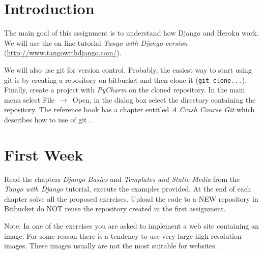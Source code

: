 \documentclass[12pt]{article} %
\begin{document}

\tableofcontents %

\newpage %



\section{Introduction} %

The main goal of this assignment is to understand how Django and Heroku work. We will use the on line tutorial \textit{Tango with Django-version} (\url{http://www.tangowithdjango.com/}). 

We will also use git for version control. Probably, the easiest way to start using git is by creating a repository on bitbucket and then clone it (\texttt{git clone...}). Finally, create a project with  \textit{PyCharm} on the cloned repository. In the main menu select File~$\rightarrow$~Open, in the dialog box select the directory containing the repository. The reference book
has a chapter entitled \textit{A Crash Course Git} which describes how to use of git . 

\section{First Week}

Read the chapters \textit{Django Basics} and \textit{Templates and Static Media} from the \textit{Tango with Django} tutorial, execute the examples provided. At the end of each chapter solve all the
proposed exercises. Upload the code to a NEW repository in Bitbucket do NOT reuse the repository created in the first assignment.

Note: In one of the exercises you are asked to implement a web site containing an image. For some reason there is a tendency to use very large high resolution images. These images usually are not the most suitable for websites.
\end{document}
